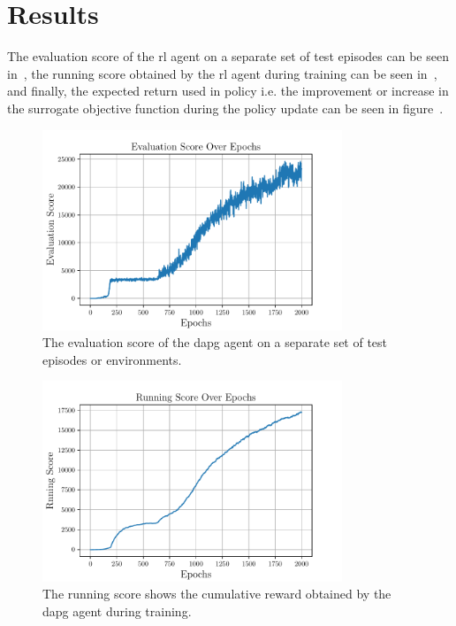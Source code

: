 \section{Results}\label{3-in-hand-manipulation-results}

The evaluation score of the \gls{rl} agent on a separate set of test episodes can be seen in~, the running score obtained by the \gls{rl} agent during training can be seen in~, and finally, the expected return used in policy i.e. the improvement or increase in the surrogate objective function during the policy update can be seen in figure~.

\begin{figure}[!h]
	\begin{center}
		\includegraphics[width=0.8\textwidth]{chapters/3-in-hand-manipulation/fig/evaluation-score-over-epochs.pdf}
	\end{center}
	\caption{The evaluation score of the \gls{dapg} agent on a separate set of test episodes or environments.}
	\label{fig:evaluation-score-over-epochs}
\end{figure}

\begin{figure}[!h]
	\begin{center}
		\includegraphics[width=0.8\textwidth]{chapters/3-in-hand-manipulation/fig/running-score-over-epochs.pdf}
	\end{center}
	\caption{The running score shows the cumulative reward obtained by the \gls{dapg} agent during training.}
	\label{fig:running-score-over-epochs}
\end{figure}

